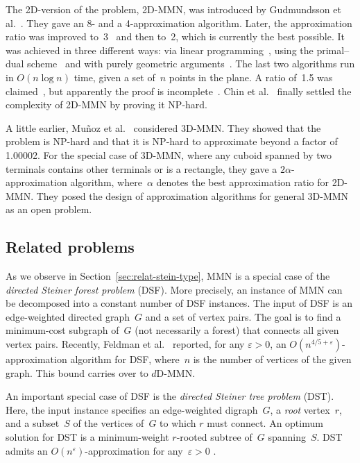 \documentclass[11pt]{llncs}
\newcommand{\eps}{\ensuremath{\varepsilon}\xspace}
\newcommand{\etal}{et al.}
\begin{document}
The 2D-version of the problem, 2D-MMN, was introduced by
Gudmundsson \etal~\cite{gln-ammn-01}.  They gave an 8- and a
4-approximation algorithm.  Later, the approximation ratio was
improved to~3~\cite{bwws-mmnpa-06,fs-s3amm-08t} and then to~2, which
is currently the best possible.  It was achieved in three different
ways: via linear programming~\cite{cnv-raamm-08}, using
the primal--dual scheme~\cite{n-eprmc-05} and with purely geometric
arguments~\cite{gsz-yaa2a-08}.  The last two algorithms run in $O(n
\log n)$ time, given a set of~$n$ points in the plane.  A ratio of~1.5 was
claimed~\cite{su-15amm-05}, but apparently the proof is
incomplete~\cite{fs-s3amm-08t}.  
Chin \etal~\cite{cgs-mmnnp-11} finally
settled the complexity of 2D-MMN by proving it NP-hard.

A little earlier, Mu{\~n}oz \etal~\cite{msu-mmnp3-09}
considered 3D-MMN.  They showed that the 
problem is NP-hard and that it is 
NP-hard to approximate beyond a
factor of 1.00002.  
For the special case of 3D-MMN, where any cuboid spanned by two
terminals contains other terminals or is a rectangle, they gave a
$2\alpha$-approximation algorithm, where~$\alpha$ denotes the best approximation
ratio for 2D-MMN.  They posed the design of approximation algorithms
for general 3D-MMN as an open problem.

\subsection{Related problems}

As we observe in Section~\ref{sec:relat-stein-type}, MMN is a special
case of the \emph{directed Steiner forest problem} (DSF).  More
precisely, an instance of MMN can be decomposed into a constant number
of DSF instances.  The input of DSF is an edge-weighted directed
graph~$G$ and a set of vertex pairs.  The goal is to find a
minimum-cost subgraph of~$G$ (not necessarily a forest) that connects
all given vertex pairs.  Recently, Feldman \etal~\cite{fkn-iaadsf-09}
reported, for any $\eps>0$, an $O(n^{4/5+\eps})$-approximation
algorithm for DSF, where~$n$ is the number of vertices of the given
graph.  This bound carries over to $d$D-MMN.

An important special case of DSF is the \emph{directed Steiner
  \emph{tree} problem} (DST).  Here, the input instance specifies an
edge-weighted digraph~$G$, a \emph{root} vertex~$r$, and a subset~$S$
of the vertices of~$G$ to which $r$ must connect.  An optimum solution
for DST is a minimum-weight $r$-rooted subtree of~$G$ spanning~$S$.
DST admits an $O(n^\eps)$-approximation for any~$\eps>0$
\cite{cccdggl-aadsp-98}.
\end{document}
